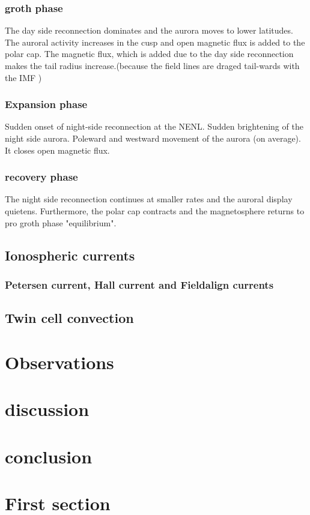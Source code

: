 \documentclass[10pt,a4paper]{article}
\begin{document}
\subsubsection{groth phase}
The day side reconnection dominates and the aurora moves to lower latitudes. The auroral activity increases in the cusp and open magnetic flux is added to the polar cap. The magnetic flux, which is added due to the day side reconnection makes the tail radius increase.(because the field lines are draged tail-wards with the IMF )
\subsubsection{Expansion phase}
Sudden onset of night-side reconnection at the NENL. Sudden brightening of the night side aurora. Poleward and westward movement of the aurora (on average). It closes open magnetic flux. 
\subsubsection{recovery phase}
The night side reconnection continues at smaller rates and the auroral display quietens. Furthermore, the polar cap contracts and the magnetosphere returns to pro groth phase "equilibrium". 

\subsection{Ionospheric currents}
\subsubsection{Petersen current, Hall current and Fieldalign currents}

\subsection{Twin cell convection}

\section{Observations}

\section{discussion}

\section{conclusion}


\section{First section}
 
\end{document}
